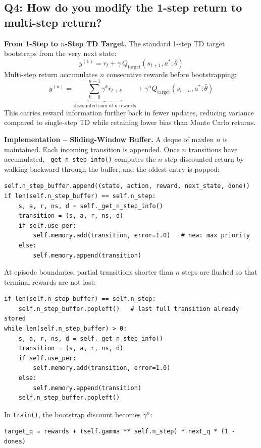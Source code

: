 \documentclass[12pt, a4paper]{report}
\begin{document}
\subsection*{Q4: How do you modify the 1-step return to multi-step return?}

\textbf{From 1-Step to $n$-Step TD Target.}
The standard 1-step TD target bootstraps from the very next state:
\[
  y^{(1)} = r_t + \gamma\, Q_\text{target}(s_{t+1}, a^*;\bar{\theta})
\]
Multi-step return accumulates $n$ consecutive rewards before bootstrapping:
\[
  y^{(n)} = \underbrace{\sum_{k=0}^{n-1} \gamma^k r_{t+k}}_{\text{discounted sum of } n \text{ rewards}}
             + \gamma^n Q_\text{target}(s_{t+n}, a^*;\bar{\theta})
\]
This carries reward information further back in fewer updates, reducing variance compared to
single-step TD while retaining lower bias than Monte Carlo returns.

\textbf{Implementation -- Sliding-Window Buffer.}
A deque of maxlen $n$ is maintained. Each incoming transition is appended. Once $n$ transitions
have accumulated, \texttt{\_get\_n\_step\_info()} computes the $n$-step discounted return by
walking backward through the buffer, and the oldest entry is popped:

\begin{lstlisting}[caption={n-step buffer management in run().}]
self.n_step_buffer.append((state, action, reward, next_state, done))
if len(self.n_step_buffer) == self.n_step:
    s, a, r, ns, d = self._get_n_step_info()
    transition = (s, a, r, ns, d)
    if self.use_per:
        self.memory.add(transition, error=1.0)   # new: max priority
    else:
        self.memory.append(transition)
\end{lstlisting}

At episode boundaries, partial transitions shorter than $n$ steps are flushed so that
terminal rewards are not lost:

\begin{lstlisting}[caption={Episode-end flush of partial n-step transitions.}]
if len(self.n_step_buffer) == self.n_step:
    self.n_step_buffer.popleft()   # last full transition already stored
while len(self.n_step_buffer) > 0:
    s, a, r, ns, d = self._get_n_step_info()
    transition = (s, a, r, ns, d)
    if self.use_per:
        self.memory.add(transition, error=1.0)
    else:
        self.memory.append(transition)
    self.n_step_buffer.popleft()
\end{lstlisting}

In \texttt{train()}, the bootstrap discount becomes $\gamma^n$:
\begin{lstlisting}
target_q = rewards + (self.gamma ** self.n_step) * next_q * (1 - dones)
\end{lstlisting}
\end{document}
